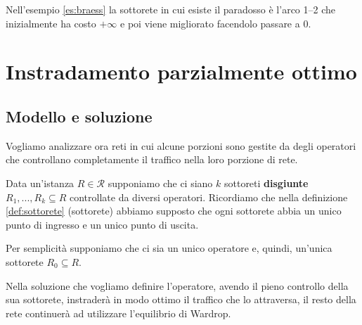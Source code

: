 \documentclass[a4paper]{article}
\theoremstyle{plain}
\theoremstyle{definition}
\theoremstyle{remark}
\begin{document}
Nell'esempio \ref{es:braess} la sottorete in cui esiste il paradosso è
l'arco 1--2 che inizialmente ha costo $+\infty$ e poi viene
migliorato facendolo passare a $0$.

\section{Instradamento parzialmente ottimo}

\subsection{Modello e soluzione}
\label{sec:por-modello}

Vogliamo analizzare ora reti in cui alcune porzioni sono gestite da
degli operatori che controllano completamente il traffico nella loro
porzione di rete.

Data un'istanza $R\in \mathcal{R}$ supponiamo che ci siano $k$
sottoreti \textbf{disgiunte} $R_1,...,R_k \subseteq R$ controllate da
diversi operatori. Ricordiamo che nella definizione
\ref{def:sottorete} (sottorete) abbiamo supposto che ogni sottorete
abbia un unico punto di ingresso e un unico punto di uscita.

Per semplicità supponiamo che ci sia un unico operatore e, quindi,
un'unica sottorete $R_0 \subseteq R$.

Nella soluzione che vogliamo definire l'operatore, avendo il pieno
controllo della sua sottorete, instraderà in modo ottimo il traffico
che lo attraversa, il resto della rete continuerà ad utilizzare
l'equilibrio di Wardrop.
\end{document}
